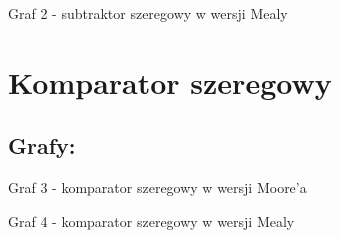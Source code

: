 \documentclass[12pt,a4paper]{article}
\begin{document}
			
			\begin{center}
				Graf 2 - subtraktor szeregowy w wersji Mealy
			\end{center}
		
		\FloatBarrier
		\restoregeometry
		
	\section{Komparator szeregowy}
	
		\subsection{Grafy:}
		
			\begin{center}
				Graf 3 - komparator szeregowy w wersji Moore'a
			\end{center}
			
			\vspace{1.5cm}
			\begin{center}
				Graf 4 - komparator szeregowy w wersji Mealy
			\end{center}
	
\end{document}
